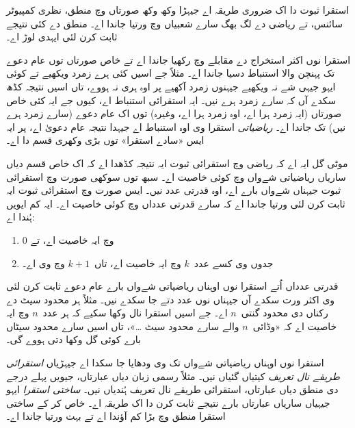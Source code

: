 \documentclass[../../../include/open-logic-section]{subfiles}
\begin{document}


استقرا ثبوت دا اک ضروری طریقہ اے جیہڑا وکھ وکھ صورتاں وچ منطق، نظری کمپیوٹر سائنس، تے ریاضی دے لگ بھگ سارے شعبیاں وچ ورتیا جاندا اے۔ منطق دے کئی نتیجے ثابت کرن لئی ایہدی لوڑ اے۔

استقرا نوں اکثر استخراج دے مقابلے وچ رکھیا جاندا اے تے خاص صورتاں توں عام دعوے تک پہنچن والا استنباط دسیا جاندا اے۔ مثلاً جے اسیں کئی ہرے زمرد ویکھیے تے کوئی ایہو جیہی شے نہ ویکھیے جیہنوں زمرد آکھیے پر اوہ ہری نہ ہووے، تاں اسیں نتیجہ کڈھ سکدے آں کہ سارے زمرد ہرے نیں۔ ایہ استقرائی استنباط اے، کیوں جے ایہ کئی خاص صورتاں (ایہ زمرد ہرا اے، اوہ زمرد ہرا اے، وغیرہ) توں اک عام دعوے (سارے زمرد ہرے نیں) تک جاندا اے۔ \emph{ریاضیاتی} استقرا وی اوہ استنباط اے جیہدا نتیجہ عام دعویٰ اے، پر ایہ ایس «سادے استقرا» توں بڑی وکھری قسم دا اے۔

موٹی گل ایہ اے کہ ریاضی وچ استقرائی ثبوت ایہ نتیجہ کڈھدا اے کہ اک خاص قسم دیاں ساریاں ریاضیاتی شےواں وچ کوئی خاصیت اے۔ سبھ توں سوکھی صورت وچ استقرائی ثبوت جیہناں شےواں بارے اے، اوہ قدرتی عدد نیں۔ ایس صورت وچ استقرائی ثبوت ایہ ثابت کرن لئی ورتیا جاندا اے کہ سارے قدرتی عدداں وچ کوئی خاصیت اے۔ ایہ کم ایویں ہُندا اے:
\begin{enumerate}
    \item $0$ وچ ایہ خاصیت اے، تے
    \item جدوں وی کسے عدد~$k$ وچ ایہ خاصیت اے، تاں~$k+1$ وچ وی اے۔
\end{enumerate}
قدرتی عدداں اُتے استقرا نوں اوہناں ریاضیاتی شےواں بارے عام دعوے ثابت کرن لئی وی اکثر ورت سکدے آں جیہناں نوں عدد دتے جا سکدے نیں۔ مثلاً ہر محدود سیٹ دے رکناں دی محدود گنتی~$n$ اے۔ جے اسیں استقرا نال وکھا سکیے کہ ہر عدد~$n$ وچ ایہ خاصیت اے کہ «وڈائی~$n$ والے سارے محدود سیٹ \dots»، تاں اسیں سارے محدود سیٹاں بارے کوئی گل وکھا دتی ہووے گی۔

استقرا نوں اوہناں ریاضیاتی شےواں تک وی ودھایا جا سکدا اے جیہڑیاں \emph{استقرائی طریقے نال تعریف} کیتیاں گئیاں نیں۔ مثلاً رسمی زبان دیاں عبارتاں، جیویں پہلے درجے دی منطق دیاں عبارتاں، استقرائی طریقے نال تعریف ہُندیاں نیں۔ \emph{ساختی استقرا} ایہو جیہیاں ساریاں عبارتاں بارے نتیجے ثابت کرن دا اک طریقہ اے۔ خاص کر کے ساختی استقرا منطق وچ بڑا کم آؤندا اے تے بہت ورتیا جاندا اے۔
\end{document}
